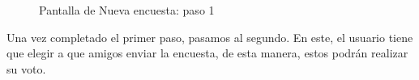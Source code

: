 \documentclass[a4paper, 12pt]{book}
\begin{document}
\begin{figure}[H]
 \centering
 \caption{Pantalla de Nueva encuesta: paso 1}
 \label{f:poll}
\end{figure}



Una vez completado el primer paso, pasamos al segundo. En este, el usuario tiene que elegir 
a que amigos enviar la encuesta, de esta manera, estos podr\'an realizar su voto. 
\end{document}
